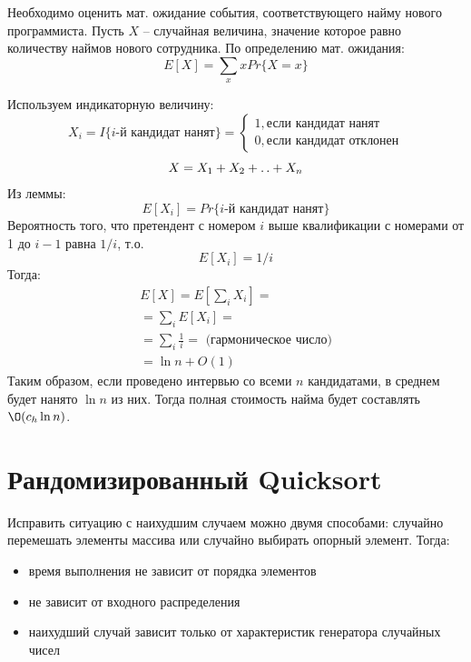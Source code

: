 \documentclass[11pt]{article}
\begin{document}
Необходимо оценить мат. ожидание события, соответствующего найму нового программиста. Пусть $X$ -- случайная величина, значение которое равно количеству наймов нового сотрудника. По определению мат. ожидания:
\begin{equation*}
E[X] = \sum_x x Pr\{X = x\}
\end{equation*}

Используем индикаторную величину:
\begin{equation*}
	X_i = I\{i\text{-й кандидат нанят}\} = \begin{cases}
		1, \text{если кандидат нанят} \\
		0, \text{если кандидат отклонен}
	\end{cases}
\end{equation*}
\begin{equation*}
X = X_1 + X_2 + \mathinner{\ldotp\ldotp} + X_n
\label{l2}
\end{equation*}
Из леммы:
\begin{equation*}
E[X_i] = Pr\{i\text{-й кандидат нанят}\}
\end{equation*}
Вероятность того, что претендент с номером $i$ выше квалификации с номерами от 1 до $i-1$ равна $1/i$, т.о.
\begin{equation*}
E[X_i] = 1/i
\end{equation*}
Тогда:
\begin{align*}
	E[X] = E[\sum_i X_i] = \\
	= \sum_i E[X_i] = \\
	= \sum_i \frac{1}{i} = \text{ (гармоническое число)} \\ 
	= \ln n + O(1)
\end{align*}
Таким образом, если проведено интервью со всеми $n$ кандидатами, в среднем будет нанято $\ln n$ из них. Тогда полная стоимость найма будет составлять $\O(c_h \ln n)$.

\section{Рандомизированный Quicksort}

Исправить ситуацию с наихудшим случаем можно двумя способами: случайно перемешать элементы массива или случайно выбирать опорный элемент. Тогда:
\begin{itemize}
\item время выполнения не зависит от порядка элементов
\item не зависит от входного распределения
\item наихудший случай зависит только от характеристик генератора случайных чисел
\end{itemize}
\end{document}
